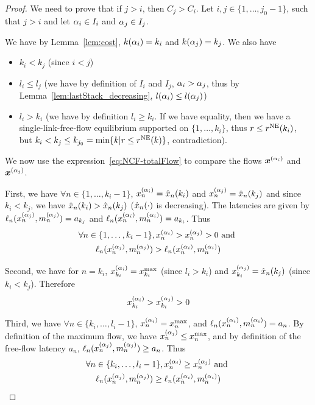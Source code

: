 \begin{proof}
We need to prove that if $j > i$, then $C_j > C_i$. Let $i, j \in \{1, \dots, j_0 - 1\}$, such that $j > i$ and let $\alpha_i \in I_i$ and $\alpha_j \in I_j$.

We have by Lemma~\ref{lem:cost}, $k(\alpha_i) = k_i$ and $k(\alpha_j) = k_j$. We also have
\begin{itemize}
\item $k_i<k_j$ (since $i<j$)
\item $l_i \leq l_j$ (we have by definition of $I_i$ and $I_j$, $\alpha_i > \alpha_j$, thus by Lemma~\ref{lem:lastStack_decreasing}, $l(\alpha_i) \leq l(\alpha_j)$)
\item $l_i > k_i$ (we have by definition $l_i \geq k_i$. If we have equality, then we have a single-link-free-flow equilibrium supported on $\{1, \dots, k_i\}$, thus $r \leq r^{\textup{NE}} ( k_{i} )$, but $k_i < k_j \leq k_{j_0} = \min \{ k | r \leq r^{\textup{NE}} ( k ) \} $, contradiction).
\end{itemize}

We now use the expression~\eqref{eq:NCF-totalFlow} to compare the flows $\boldsymbol {x}^{(\alpha_i)}$ and~$\boldsymbol {x}^{(\alpha_j)}$.

First, we have $\forall n \in \{1, \dots, k_i-1\}$, $x_n^{(\alpha_i)} = \hat{x}_{n} ( k_i )$ and $x_n^{(\alpha_j)} = \hat{x}_{n} ( k_j )$ and since $k_i < k_j$, we have $\hat{x}_{n} ( k_i ) > \hat{x}_{n} ( k_j )$ ($\hat{x}_{n} ( \cdot )$ is decreasing). The latencies are given by $\ell_n(x_n^{(\alpha_j)}, m_n^{(\alpha_j)}) = a_{k_j}$ and $\ell_n(x_n^{(\alpha_i)}, m_n^{(\alpha_i)}) = a_{k_i}$. Thus
\begin{multline}
\forall n \in \{1, \dots, k_i - 1\},
x_n^{(\alpha_i)} > x_n^{(\alpha_j)} > 0 \text{ and } \\ 
\ell_n(x_n^{(\alpha_j)}, m_n^{(\alpha_j)}) > \ell_n(x_n^{(\alpha_i)}, m_n^{(\alpha_i)})
\label{eq:thm_proof_1}
\end{multline}

Second, we have for $n = k_i$, $x_{k_i}^{(\alpha_i)} = x^{\max}_{k_i} $ (since $l_i > k_i$) and $x_{k_i}^{(\alpha_j)} = \hat{x}_{n} ( k_j )$ (since $k_i < k_j$). Therefore
\begin{equation}
x_{k_i}^{(\alpha_i)} > x_{k_i}^{(\alpha_j)} > 0  
\label{eq:thm_proof_2}
\end{equation}

Third, we have $\forall n \in \{k_i, \dots, l_i-1\}$, $x_n^{(\alpha_i)} = x^{\max}_n$, and $\ell_n(x_n^{(\alpha_i)}, m_n^{(\alpha_i)}) = a_n$. By definition of the maximum flow, we have $x_n^{(\alpha_j)} \leq x^{\max}_n$, and by definition of the free-flow latency $a_n$, $\ell_n(x_n^{(\alpha_j)}, m_n^{(\alpha_j)}) \geq a_n$. Thus
\begin{multline}
\forall n \in \{k_i, \dots, l_i - 1\}, x_n^{(\alpha_i)} \geq x_n^{(\alpha_j)} \text{ and } \\
\ell_n(x_n^{(\alpha_j)}, m_n^{(\alpha_j)}) \geq \ell_n(x_n^{(\alpha_i)}, m_n^{(\alpha_i)})
\label{eq:thm_proof_3}
\end{multline}


\end{proof}
